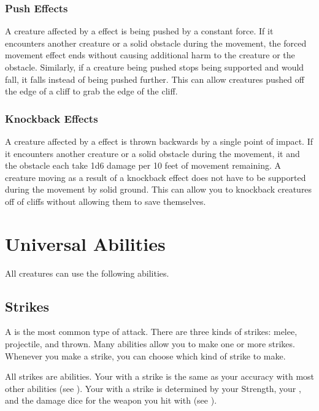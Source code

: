         \subsubsection{Push Effects}\label{Push Effects}
            A creature affected by a  effect is being pushed by a constant force.
            If it encounters another creature or a solid obstacle during the movement, the forced movement effect ends without causing additional harm to the creature or the obstacle.
            Similarly, if a creature being pushed stops being supported and would fall, it falls instead of being pushed further.
            This can allow creatures pushed off the edge of a cliff to grab the edge of the cliff.

        \subsubsection{Knockback Effects}\label{Knockback Effects}
            A creature affected by a  effect is thrown backwards by a single point of impact.
            If it encounters another creature or a solid obstacle during the movement, it and the obstacle each take 1d6 damage per 10 feet of movement remaining.
            A creature moving as a result of a knockback effect does not have to be supported during the movement by solid ground.
            This can allow you to knockback creatures off of cliffs without allowing them to save themselves.

\section{Universal Abilities}\label{Universal Abilities}
    All creatures can use the following abilities.

    \subsection{Strikes}\label{Strikes}
        A  is the most common type of attack.
        There are three kinds of strikes: melee, projectile, and thrown.
        Many abilities allow you to make one or more strikes.
        Whenever you make a strike, you can choose which kind of strike to make.

        All strikes are  abilities.
        Your  with a strike is the same as your accuracy with most other abilities (see ).
        Your  with a strike is determined by your Strength, your , and the damage dice for the weapon you hit with (see ).

